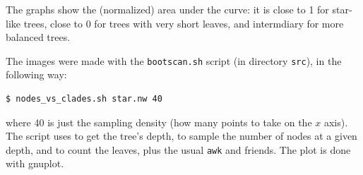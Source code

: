 The graphs show the (normalized) area under the curve: it is close to 1 for star-like trees, close to 0 for trees with very short leaves, and intermdiary for more balanced trees.

The images were made with the \texttt{bootscan.sh} script (in directory \texttt{src}), in the following way:
\begin{verbatim}
$ nodes_vs_clades.sh star.nw 40
\end{verbatim}
where 40 is just the sampling density (how many points to take on the $x$
axis). The script uses \distance{} to get the tree's depth, \ed{} to sample the number of nodes at a given depth, and \nwindent{} to count the leaves, plus the usual \texttt{awk} and friends. The plot is done with gnuplot.
